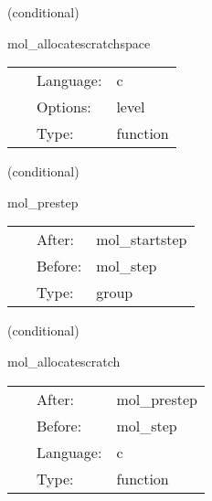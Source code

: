 \vspace{5mm}

   (conditional) 

\hspace{5mm} mol\_allocatescratchspace 

\hspace{5mm}{\it allocate storage for scratch levels } 


\hspace{5mm}

 \begin{tabular*}{160mm}{cll} 
~ & Language:  & c \\ 
~ & Options:  & level \\ 
~ & Type:  & function \\ 
\end{tabular*} 


\vspace{5mm}

   (conditional) 

\hspace{5mm} mol\_prestep 

\hspace{5mm}{\it physics thorns can schedule preloop setup routines in here } 


\hspace{5mm}

 \begin{tabular*}{160mm}{cll} 
~ & After:  & mol\_startstep \\ 
~ & Before:  & mol\_step \\ 
~ & Type:  & group \\ 
\end{tabular*} 


\vspace{5mm}

   (conditional) 

\hspace{5mm} mol\_allocatescratch 

\hspace{5mm}{\it allocate sufficient space for array scratch variables } 


\hspace{5mm}

 \begin{tabular*}{160mm}{cll} 
~ & After:  & mol\_prestep \\ 
~ & Before:  & mol\_step \\ 
~ & Language:  & c \\ 
~ & Type:  & function \\ 
\end{tabular*} 


